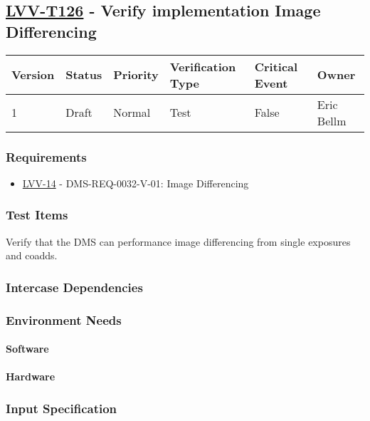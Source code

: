 \subsection{\href{https://jira.lsstcorp.org/secure/Tests.jspa\#/testCase/LVV-T126}{LVV-T126}
    - Verify implementation  Image Differencing}\label{lvv-t126}

\begin{longtable}[]{llllll}
\toprule
Version & Status & Priority & Verification Type & Critical Event & Owner
\\\midrule
1 & Draft & Normal &
Test & False & Eric Bellm
\\\bottomrule
\end{longtable}

\subsubsection{Requirements}
\begin{itemize}
\item \href{https://jira.lsstcorp.org/browse/LVV-14}{LVV-14} - DMS-REQ-0032-V-01: Image Differencing
\end{itemize}

\subsubsection{Test Items}
Verify that the DMS can performance image differencing from single
exposures and coadds.



\subsubsection{Intercase Dependencies}

\subsubsection{Environment Needs}

\paragraph{Software}

\paragraph{Hardware}

\subsubsection{Input Specification}

